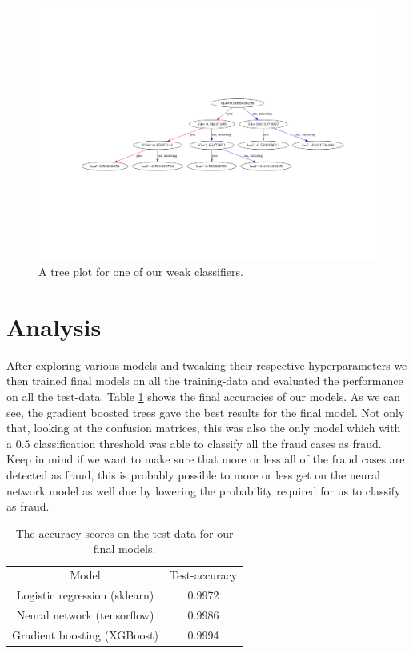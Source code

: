 \documentclass{article}
\begin{document}
\begin{figure}
	\centering
	\includegraphics[scale=0.8]{xgb_final_tree_plot}
	\caption{A tree plot for one of our weak classifiers.}
	\label{xgbtreeplot}
\end{figure}

\section{Analysis}
After exploring various models and tweaking their respective hyperparameters we
then trained final models on all the training-data and evaluated the
performance on all the test-data. Table \ref{finalmodelscomparison} shows the
final accuracies of our models. As we can see, the gradient boosted trees gave
the best results for the final model. Not only that, looking at the confusion
matrices, this was also the only model which with a $0.5$ classification
threshold was able to classify all the fraud cases as fraud. Keep in mind if we
want to make sure that more or less all of the fraud cases are detected as
fraud, this is probably possible to more or less get on the neural network
model as well due by lowering the probability required for us to classify as
fraud.
\begin{table}
	\centering
	\begin{tabular}{| c | c |}
		Model                         & Test-accuracy \\
		Logistic regression (sklearn) & 0.9972        \\
		Neural network (tensorflow)   & 0.9986        \\
		Gradient boosting (XGBoost)   & 0.9994
	\end{tabular}
	\caption{The accuracy scores on the test-data for our final models.}
	\label{finalmodelscomparison}
\end{table}
\end{document}

